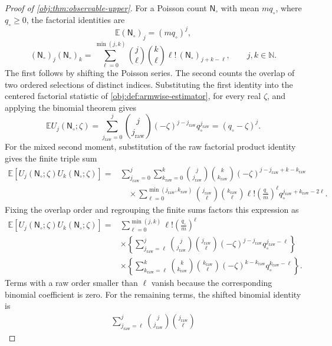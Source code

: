 \documentclass[11pt]{article}
\begin{document}
\begin{proof}[Proof of \cref{obj:thm:observable-upper}]
For a Poisson count \(\mathsf N_\circ\) with mean \(m q_\circ\), where \(q_\circ\ge0\), the factorial identities are
\[
\mathbb E(\mathsf N_\circ)_j=(m q_\circ)^j,
\]
\[
(\mathsf N_\circ)_j(\mathsf N_\circ)_k
=
\sum_{\ell=0}^{\min(j,k)}
\binom j\ell\binom k\ell\ell!\,
(\mathsf N_\circ)_{j+k-\ell},
\qquad j,k\in\mathbb N.
\]
The first follows by shifting the Poisson series. The second counts the overlap of two ordered selections of distinct indices. Substituting the first identity into the centered factorial statistic of \cref{obj:def:armwise-estimator}, for every real \(\zeta\), and applying the binomial theorem gives
\[
\mathbb E U_j(\mathsf N_\circ;\zeta)
=
\sum_{j_{\mathrm{raw}}=0}^{j}
\binom j{j_{\mathrm{raw}}}(-\zeta)^{j-j_{\mathrm{raw}}}
q_\circ^{j_{\mathrm{raw}}}
=(q_\circ-\zeta)^j.
\]
For the mixed second moment, substitution of the raw factorial product identity gives the finite triple sum
\[
\begin{aligned}
\mathbb E[U_j(\mathsf N_\circ;\zeta)U_k(\mathsf N_\circ;\zeta)]
={}&
\sum_{j_{\mathrm{raw}}=0}^{j}
\sum_{k_{\mathrm{raw}}=0}^{k}
\binom j{j_{\mathrm{raw}}}\binom k{k_{\mathrm{raw}}}
(-\zeta)^{j-j_{\mathrm{raw}}+k-k_{\mathrm{raw}}}\\
&\quad\times
\sum_{\ell=0}^{\min(j_{\mathrm{raw}},k_{\mathrm{raw}})}
\binom{j_{\mathrm{raw}}}\ell
\binom{k_{\mathrm{raw}}}\ell\ell!
\left(\frac{q_\circ}{m}\right)^\ell
q_\circ^{j_{\mathrm{raw}}+k_{\mathrm{raw}}-2\ell}.
\end{aligned}
\]
Fixing the overlap order and regrouping the finite sums factors this expression as
\[
\begin{aligned}
\mathbb E[U_j(\mathsf N_\circ;\zeta)U_k(\mathsf N_\circ;\zeta)]
={}&\sum_{\ell=0}^{\min(j,k)}
\ell!\left(\frac{q_\circ}{m}\right)^\ell\\
&\times\left\{
\sum_{j_{\mathrm{raw}}=\ell}^{j}
\binom j{j_{\mathrm{raw}}}\binom{j_{\mathrm{raw}}}\ell
(-\zeta)^{j-j_{\mathrm{raw}}}
q_\circ^{j_{\mathrm{raw}}-\ell}
\right\}\\
&\times\left\{
\sum_{k_{\mathrm{raw}}=\ell}^{k}
\binom k{k_{\mathrm{raw}}}\binom{k_{\mathrm{raw}}}\ell
(-\zeta)^{k-k_{\mathrm{raw}}}
q_\circ^{k_{\mathrm{raw}}-\ell}
\right\}.
\end{aligned}
\]
Terms with a raw order smaller than \(\ell\) vanish because the corresponding binomial coefficient is zero. For the remaining terms, the shifted binomial identity is
\[
\begin{aligned}
\sum_{j_{\mathrm{raw}}=\ell}^{j}
\binom j{j_{\mathrm{raw}}}\binom{j_{\mathrm{raw}}}\ell

\end{aligned}\]
\end{proof}
\end{document}
